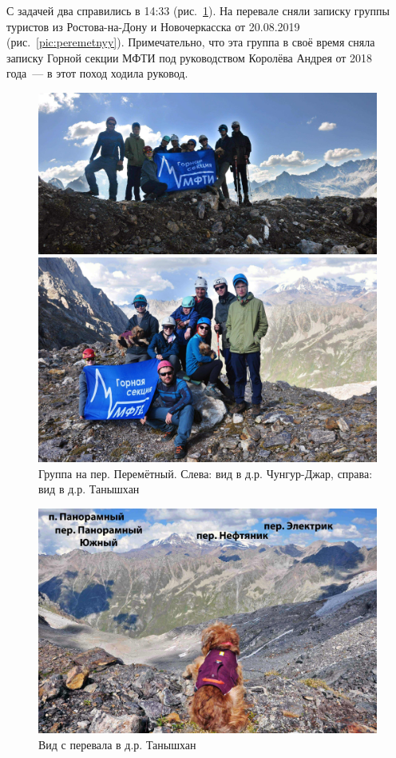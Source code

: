 С задачей два справились в 14:33 (рис.~\ref{fig:DSC_0412}). На перевале сняли записку группы туристов из Ростова-на-Дону и Новочеркасска от 20.08.2019 (рис.~\ref{pic:peremetnyy}). Примечательно, что эта группа в своё время сняла записку Горной секции МФТИ под руководством Королёва Андрея от 2018 года~--- в этот поход ходила руковод.

\begin{figure}[h!]
	\centering
	\begin{minipage}[h]{0.55\linewidth}
		\includegraphics[width=0.99\linewidth]{../pics/DSC_0412 2.jpg}
	\end{minipage}
	\hfill
	\begin{minipage}[h]{0.45\linewidth}
		\includegraphics[width=0.99\linewidth]{../pics/DSC_0419 2.jpg}
	\end{minipage}
	\caption{Группа на пер. Перемётный. Слева: вид в д.р. Чунгур-Джар, справа: вид в д.р. Танышхан}
	\label{fig:DSC_0412}
\end{figure}


\begin{figure}[h!]
	\centering
	\includegraphics[width=0.7\linewidth]{../pics/DSC_0385 2.jpg}
	\caption{Вид с перевала в д.р. Танышхан}
	\label{fig:DSC_0385 2}
\end{figure} 


